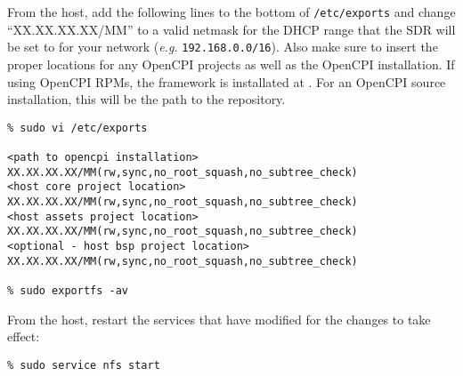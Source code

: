 From the host, add the following lines to the bottom of \texttt{/etc/exports} and change ``XX.XX.XX.XX/MM'' to a valid netmask for the DHCP range that the SDR will be set to for your network (\textit{e.g.} \texttt{192.168.0.0/16}). Also make sure to insert the proper locations for any OpenCPI projects as well as the OpenCPI installation. If using OpenCPI RPMs, the framework is installated at . For an OpenCPI source installation, this will be the path to the  repository.
\begin{verbatim}
% sudo vi /etc/exports

<path to opencpi installation>         XX.XX.XX.XX/MM(rw,sync,no_root_squash,no_subtree_check)
<host core project location>           XX.XX.XX.XX/MM(rw,sync,no_root_squash,no_subtree_check)
<host assets project location>         XX.XX.XX.XX/MM(rw,sync,no_root_squash,no_subtree_check)
<optional - host bsp project location> XX.XX.XX.XX/MM(rw,sync,no_root_squash,no_subtree_check)

% sudo exportfs -av
\end{verbatim}

From the host, restart the services that have modified for the changes to take effect:
\begin{verbatim}
% sudo service nfs start
\end{verbatim}

\setlength{\parindent}{\savedparindentnfs}%
